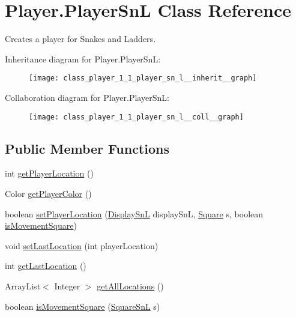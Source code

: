 \hypertarget{class_player_1_1_player_sn_l}{}\section{Player.\+Player\+Sn\+L Class Reference}
\label{class_player_1_1_player_sn_l}


Creates a player for Snakes and Ladders.  




Inheritance diagram for Player.\+Player\+Sn\+L\+:
\nopagebreak
\begin{figure}[H]
\begin{center}
\leavevmode
\texttt{[image: class\_player\_1\_1\_player\_sn\_l\_\_inherit\_\_graph]}
\end{center}
\end{figure}


Collaboration diagram for Player.\+Player\+Sn\+L\+:
\nopagebreak
\begin{figure}[H]
\begin{center}
\leavevmode
\texttt{[image: class\_player\_1\_1\_player\_sn\_l\_\_coll\_\_graph]}
\end{center}
\end{figure}
\subsection*{Public Member Functions}
\begin{DoxyCompactItemize}
\item 
int \hyperlink{class_player_1_1_player_sn_l_a36a358c20cb0f45cc87e7975befebbcc}{get\+Player\+Location} ()
\item 
Color \hyperlink{class_player_1_1_player_sn_l_a7d5b12033c99b19fda1be39e30470b2c}{get\+Player\+Color} ()
\item 
boolean \hyperlink{class_player_1_1_player_sn_l_a0b10f61660837878f6d3b9306b9cc8f3}{set\+Player\+Location} (\hyperlink{class_display_1_1_display_sn_l}{Display\+Sn\+L} display\+Sn\+L, \hyperlink{class_square_1_1_square}{Square} s, boolean \hyperlink{class_player_1_1_player_sn_l_a643b8e902d4c0701ead60eea0099107b}{is\+Movement\+Square})
\item 
void \hyperlink{class_player_1_1_player_sn_l_a31b9b469c7aabb27b5da8c38699587f3}{set\+Last\+Location} (int player\+Location)
\item 
int \hyperlink{class_player_1_1_player_sn_l_ac13c20e8675be07704620e1e54e714cc}{get\+Last\+Location} ()
\item 
Array\+List$<$ Integer $>$ \hyperlink{class_player_1_1_player_sn_l_a2f2c8d17959786a2c6ed0770fdf2d4df}{get\+All\+Locations} ()
\item 
boolean \hyperlink{class_player_1_1_player_sn_l_a643b8e902d4c0701ead60eea0099107b}{is\+Movement\+Square} (\hyperlink{class_square_1_1_square_sn_l}{Square\+Sn\+L} s)
\end{DoxyCompactItemize}
